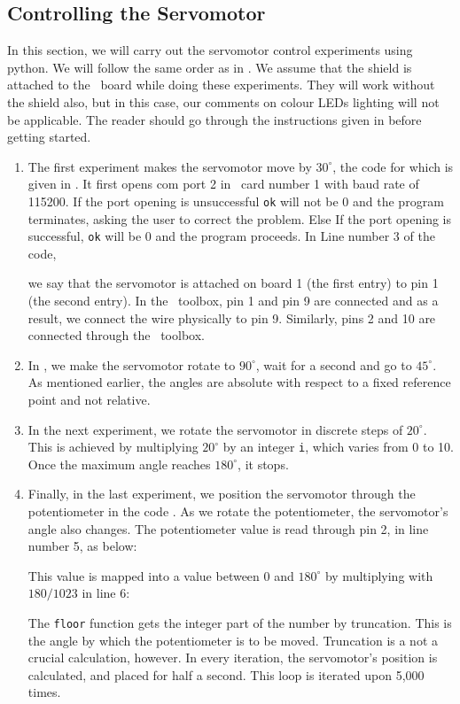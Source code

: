 \subsection{Controlling the Servomotor}
\label{sec:servo-py}
In this section, we will carry out the servomotor control experiments
using python.  We will follow the same order as in
.  We assume that the shield is attached to the
\arduino\ board while doing these experiments.  They will work without
the shield also, but in this case, our comments on colour LEDs
lighting will not be applicable.  The reader should go through the
instructions given in  before getting started.
\begin{enumerate}
\item The first experiment makes the servomotor move by $30^\circ$,
  the code for which is given in .
  It first opens com port 2 in \arduino\ card number 1 with baud rate
  of 115200.  If the port opening is unsuccessful {\tt ok} will not be
  0 and the program terminates, asking the user to correct the
  problem.  Else If the port opening is successful, {\tt ok} will be 0
  and the program proceeds.  In Line number 3 of the code, \ie\
  
  we say that the servomotor is attached on board 1 (the first entry)
  to pin 1 (the second entry).  In the \scilab\ toolbox, pin 1 and pin
  9 are connected and as a result, we connect the wire physically to
  pin 9.  Similarly, pins 2 and 10 are connected through the
  \scilab\ toolbox.

\item In , we make the servomotor rotate
  to $90^\circ$, wait for a second and go to $45^\circ$.  As mentioned
  earlier, the angles are absolute with respect to a fixed reference
  point and not relative.  

\item In the next experiment, we rotate the servomotor in discrete
  steps of $20^\circ$.  This is achieved by multiplying $20^\circ$ by
  an integer {\tt i}, which varies from 0 to 10.  Once the maximum
  angle reaches $180^\circ$, it stops.  

\item Finally, in the last experiment, we position the servomotor
  through the potentiometer in the code .  As we
  rotate the potentiometer, the servomotor's angle also changes.  The
  potentiometer value is read through pin 2, in line number 5, as
  below:
  
  This value is mapped into a value between 0 and $180^\circ$ by
  multiplying with $180/1023$ in line 6:
  
  The {\tt floor} function gets the integer part of the number by
  truncation.  This is the angle by which the potentiometer is to be
  moved.  Truncation is a not a crucial calculation, however.  In
  every iteration, the servomotor's position is calculated, and placed
  for half a second.  This loop is iterated upon 5,000 times.
\end{enumerate}

